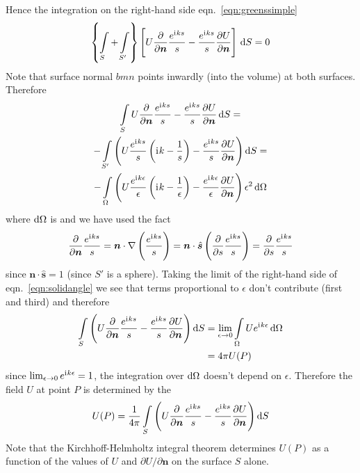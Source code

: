 Hence the integration on the right-hand side eqn.~\eqref{eqn:greenssimple}
%
\begin{equation}
    \left\{ \int\limits_{S} + \int\limits_{S'} \right\} \left[U \pdv{}{\bm{n}} \frac{e^{\iu k s}}{s} - \frac{e^{\iu k s}}{s} \pdv{U}{\bm{n}}\right]\,\dif S = 0
\end{equation}
%
Note that surface normal \(bm{n}\) points inwardly (into the volume) at both surfaces.
%
Therefore
%
\begin{multline}
    \int\limits_{S} U \pdv{}{\bm{n}} \frac{e^{\iu k s}}{s} - \frac{e^{\iu k s}}{s} \pdv{U}{\bm{n}} \dif S = \\
    - \int\limits_{S'} \left( U \frac{e^{\iu k s}}{s} \left( \iu k  - \frac{1}{s} \right) - \frac{e^{\iu k s}}{s} \pdv{U}{\bm{n}} \right) \dif S = \\
    - \int\limits_{\Omega} \left( U \frac{e^{\iu k \epsilon}}{\epsilon} \left( \iu k  - \frac{1}{\epsilon} \right) - \frac{e^{\iu k \epsilon}}{\epsilon} \pdv{U}{\bm{n}} \right)\epsilon^2 \dif \Omega \label{eqn:solidangle}
\end{multline}
%
where \(\dif \Omega\) is  and we have used the fact
\begin{equation}
    \pdv{}{\bm{n}} \frac{e^{\mathrm{i}\mkern1mu k s}}{s} = \bm{n}\cdot \nabla \left( \frac{e^{\mathrm{i}\mkern1mu k s}}{s} \right) = \bm{n} \cdot \hat{\bm{s}} \left( \pdv{}{s} \frac{e^{\mathrm{i}\mkern1mu k s}}{s}\right) =  \pdv{}{s} \frac{e^{\mathrm{i}\mkern1mu k s}}{s}
\end{equation}
since \(\bm{n} \cdot \hat{\bm{s}} = 1\) (since \(S'\) is a sphere).
%
Taking the limit of the right-hand side of eqn.~\eqref{eqn:solidangle} we see that terms proportional to \(\epsilon\) don't contribute (first and third) and therefore
%
\begin{align}
    \int\limits_{S} \left( U \pdv{}{\bm{n}} \frac{e^{\iu k s}}{s} - \frac{e^{\iu k s}}{s} \pdv{U}{\bm{n}} \right) \dif S & = \lim_{\epsilon \rightarrow 0} \int\limits_{\Omega} U e^{\iu k \epsilon} \dif \Omega \\
                                                                                                          & = 4 \pi U(P)
\end{align}
%
since \(\lim_{\epsilon \rightarrow 0} e^{\mathrm{i}\mkern1mu k \epsilon} = 1\), the integration over \(\dif \Omega\) doesn't depend on \(\epsilon\).
%
Therefore the field \(U\) at point \(P\) is determined by the 
%
\begin{equation}
    U(P) = \frac{1}{4 \pi}\int\limits_{S} \left( U \pdv{}{\bm{n}} \frac{e^{\iu k s}}{s} - \frac{e^{\iu k s}}{s} \pdv{U}{\bm{n}} \right) \dif S \label{eqn:kirchoffhelmintegral}
\end{equation}
%
Note that the Kirchhoff-Helmholtz integral theorem determines \(U(P)\) as a function of the values of \(U\) and \(\partial U / \partial \bm{n}\) on the surface \(S\) alone.

